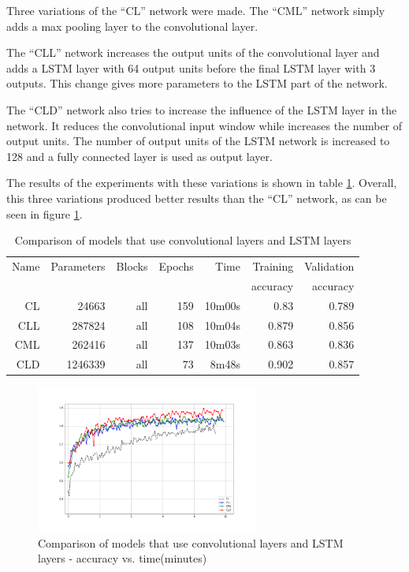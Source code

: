 
Three variations of the ``CL'' network were made.
The ``CML'' network simply adds a max pooling layer to the convolutional layer.

The ``CLL'' network increases the output units of the convolutional layer and adds a LSTM layer with 64 output units before the final LSTM layer with 3 outputs. This change gives more parameters to the LSTM part of the network.

The ``CLD'' network also tries to increase the influence of the LSTM layer in the network. It reduces the convolutional input window while increases the number of output units. The number of output units of the LSTM network is increased to 128 and a fully connected layer is used as output layer.

The results of the experiments with these variations is shown in table \ref{tab:carvingclvariations}.
Overall, this three variations produced better results than the ``CL'' network, as can be seen in figure \ref{fig:cl-variations}.

\begin{table}[!ht]
    \centering
    \caption[CL variations]{Comparison of models that use convolutional layers and LSTM layers}
    \label{tab:carvingclvariations}
\begin{tabular}{r|r|r|r|r|r|r}
\hline
Name & Parameters & Blocks & Epochs & Time    & Training          & Validation          \\       
     &            &        &        &         &          accuracy &            accuracy \\ \hline\hline

CL      & 24663     & all   & 159   & 10m00s    & 0.83  & 0.789 \\\hline
CLL     & 287824    & all   & 108   & 10m04s    & 0.879 & 0.856 \\\hline
CML     & 262416    & all   & 137   & 10m03s    & 0.863 & 0.836 \\\hline
CLD     & 1246339   & all   & 73    & 8m48s     & 0.902 & 0.857 \\\hline
\end{tabular}
\end{table}

\begin{figure}[htb!]
\centering\includegraphics[width=0.65\textwidth]{content/CL-CLL-CML-CLD.png}
\caption[CL variations]{\label{fig:cl-variations}Comparison of models that use convolutional layers and LSTM layers - accuracy vs. time(minutes)}%
\end{figure}
